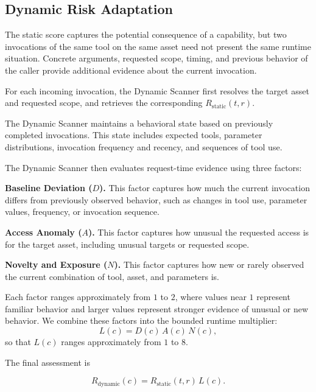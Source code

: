 \documentclass[sigconf]{acmart}
\begin{document}
\subsection{Dynamic Risk Adaptation}
\label{sec:dynamic}

The static score captures the potential consequence of a capability, but two
invocations of the same tool on the same asset need not present the same
runtime situation. Concrete arguments, requested scope, timing, and previous
behavior of the caller provide additional evidence about the current
invocation.

For each incoming invocation, the Dynamic Scanner first resolves the target
asset and requested scope, and retrieves the corresponding
$R_{\mathrm{static}}(t,r)$.

The Dynamic Scanner maintains a behavioral state based on previously completed
invocations. This state includes expected tools, parameter distributions,
invocation frequency and recency, and sequences of tool use.

The Dynamic Scanner then evaluates request-time evidence using three factors:

\textbf{Baseline Deviation ($D$).}
This factor captures how much the current invocation differs from previously
observed behavior, such as changes in tool use, parameter values, frequency,
or invocation sequence.

\textbf{Access Anomaly ($A$).}
This factor captures how unusual the requested access is for the target
asset, including unusual targets or requested scope.

\textbf{Novelty and Exposure ($N$).}
This factor captures how new or rarely observed the current combination of
tool, asset, and parameters is.

Each factor ranges approximately from $1$ to $2$, where values near $1$
represent familiar behavior and larger values represent stronger evidence of
unusual or new behavior. We combine these factors into the bounded runtime multiplier:
\begin{equation}
L(c)=D(c)\,A(c)\,N(c),
\label{eq:runtime-factor}
\end{equation}
so that $L(c)$ ranges approximately from $1$ to $8$.

The final assessment is

\begin{equation}
R_{\mathrm{dynamic}}(c)
=
R_{\mathrm{static}}(t,r)\,L(c).
\label{eq:dynamic-risk}
\end{equation}
\end{document}
